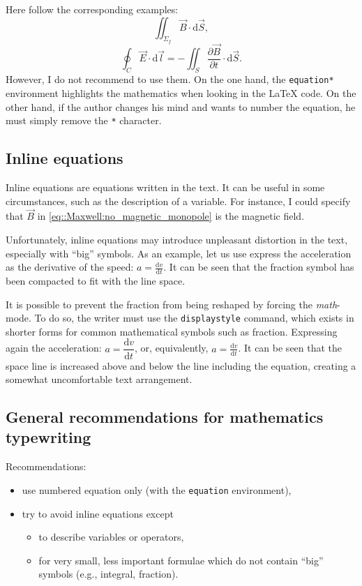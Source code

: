 \documentclass[11pt, a4paper]{report}
\begin{document}
			Here follow the corresponding examples:
			$$ \iint_{\Sigma_f} \vec{B} \cdot \mathrm{d}\vec{S}, $$
			\[ \oint_{C} \vec{E} \cdot \mathrm{d}\vec{l} = - \iint_{S} \frac{\partial\vec{B}}{\partial t} \cdot \mathrm{d}\vec{S}. \]
			However, I do not recommend to use them. 
			On the one hand, the \texttt{equation*} environment highlights the mathematics when looking in the \LaTeX{} code.
			On the other hand, if the author changes his mind and wants to number the equation, he must simply remove the \texttt{*} character.
		
		
		\subsection{Inline equations}
		
			Inline equations are equations written in the text.
			It can be useful in some circumstances, such as the description of a variable.
			For instance, I could specify that $\vec{B}$ in \cref{eq::Maxwell:no_magnetic_monopole} is the magnetic field.
			
			Unfortunately, inline equations may introduce unpleasant distortion in the text, especially with \enquote{big} symbols.
			As an example, let us use express the acceleration as the derivative of the speed:
			$a=\frac{\mathrm{d}v}{\mathrm{d}t}$.
			It can be seen that the fraction symbol has been compacted to fit with the line space.
			
			It is possible to prevent the fraction from being reshaped by forcing the \textit{math}-mode.
			To do so, the writer must use the \texttt{displaystyle} command, which exists in shorter forms for common mathematical symbols such as fraction.
			Expressing again the acceleration:
			$a=\dfrac{\mathrm{d}v}{\mathrm{d}t}$, or, equivalently,
			$\displaystyle a=\frac{\mathrm{d}v}{\mathrm{d}t}$.
			It can be seen that the space line is increased above and below the line including the equation, creating a somewhat uncomfortable text arrangement.
			
		
		\subsection{General recommendations for mathematics typewriting}
			
			Recommendations:
			\begin{itemize}
				\item use numbered equation only (with the \texttt{equation} environment),
				\item try to avoid inline equations except
				\begin{itemize}
					\item to describe variables or operators,
					\item for very small, less important formulae which do not contain \enquote{big} symbols (e.g., integral, fraction).
				\end{itemize}
			\end{itemize}
%
\end{document}
